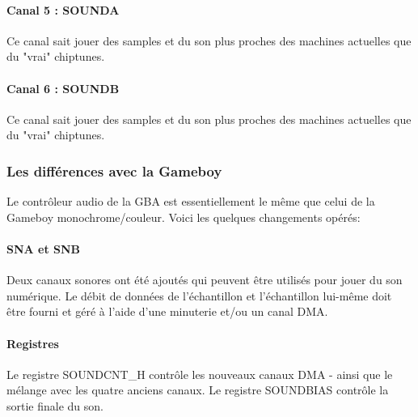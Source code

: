\documentclass[12pt,a4paper]{article}
\begin{document}
        
        \paragraph{Canal 5 : SOUNDA} Ce canal sait jouer des samples et du son plus proches des machines actuelles que du "vrai" chiptunes. 
        
        
        \paragraph{Canal 6 : SOUNDB} Ce canal sait jouer des samples et du son plus proches des machines actuelles que du "vrai" chiptunes. 
        
        
        \subsubsection{Les différences avec la Gameboy}
        
        Le contrôleur audio de la GBA est essentiellement le même que celui de la Gameboy monochrome/couleur. Voici les quelques changements opérés:
        
            \paragraph{SNA et SNB} Deux canaux sonores ont été ajoutés qui peuvent être utilisés pour jouer du son numérique. Le débit de données de l'échantillon et l'échantillon lui-même doit être fourni et géré à l'aide d'une minuterie et/ou un canal DMA.
            
            \paragraph{Registres} Le registre SOUNDCNT\_H contrôle les nouveaux canaux DMA - ainsi que le mélange avec les quatre anciens canaux. Le registre SOUNDBIAS contrôle la sortie finale du son.
            
\end{document}
